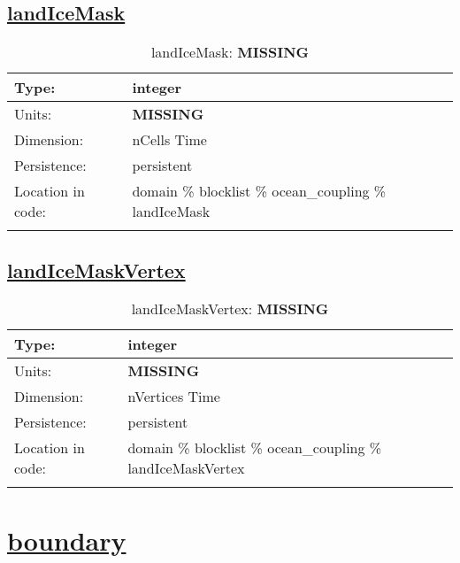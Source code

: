 \subsection[landIceMask]{\hyperref[sec:var_tab_ocean_coupling]{landIceMask}}
\label{subsec:var_sec_ocean_coupling_landIceMask}
\begin{center}
\begin{longtable}{| p{2.0in} | p{4.0in} |}
        \hline 
        Type: & integer \\
        \hline 
        Units: & {\bf \color{red} MISSING} \\
        \hline 
        Dimension: & nCells Time \\
        \hline 
        Persistence: & persistent \\
        \hline 
         Location in code: & domain \% blocklist \% ocean\_coupling \% landIceMask \\
         \hline 
    \caption{landIceMask: {\bf \color{red} MISSING}}
\end{longtable}
\end{center}
\subsection[landIceMaskVertex]{\hyperref[sec:var_tab_ocean_coupling]{landIceMaskVertex}}
\label{subsec:var_sec_ocean_coupling_landIceMaskVertex}
\begin{center}
\begin{longtable}{| p{2.0in} | p{4.0in} |}
        \hline 
        Type: & integer \\
        \hline 
        Units: & {\bf \color{red} MISSING} \\
        \hline 
        Dimension: & nVertices Time \\
        \hline 
        Persistence: & persistent \\
        \hline 
         Location in code: & domain \% blocklist \% ocean\_coupling \% landIceMaskVertex \\
         \hline 
    \caption{landIceMaskVertex: {\bf \color{red} MISSING}}
\end{longtable}
\end{center}
\section[boundary]{\hyperref[sec:var_tab_boundary]{boundary}}
\label{sec:var_sec_boundary}
